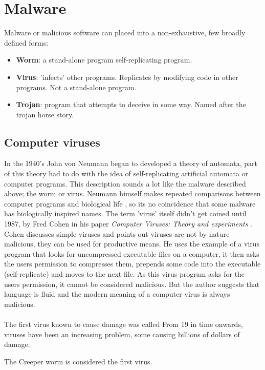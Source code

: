 \section{Malware}
Malware or malicious software can placed into a non-exhaustive, few broadly defined forms:
\begin{itemize}
\item \textbf{Worm}: a stand-alone program self-replicating program.\\
\item \textbf{Virus}: 'infects' other programs. Replicates by modifying code in other programs. Not a stand-alone program.
\item \textbf{Trojan}: program that attempts to deceive in some way. Named after the trojan horse story.
\end{itemize}

\subsection{Computer viruses}
In the 1940's John von Neumann began to developed a theory of automata, part of this theory had to do with the idea of self-replicating artificial automata \cite{neumann} or computer programs. This description sounds a lot like the malware described above; the worm or virus. Neumann himself makes repeated comparisons between computer programs and biological life \cite{neumannA}, so its no coincidence that some malware has biologically inspired names. The term 'virus' itself didn't get coined until 1987, by  Fred Cohen in his paper \textit{Computer Viruses: Theory and experiments} \cite{cohen87}. Cohen discusses simple viruses and points out viruses are not by nature malicious, they can be used for productive means. He uses the example of a virus program that looks for uncompressed executable files on a computer, it then asks the users permission to compresses them, prepends some code into the executable (self-replicate) and moves to the next file. As this virus program asks for the users permission, it cannot be considered malicious. But the author suggests that language is fluid and the modern meaning of a computer virus is always malicious.\\\\

The first virus known to cause damage was called 
From 19 in time onwards, viruses have been an increasing problem, some causing billions of dollars of damage. 


The Creeper worm is considered the first virus.

